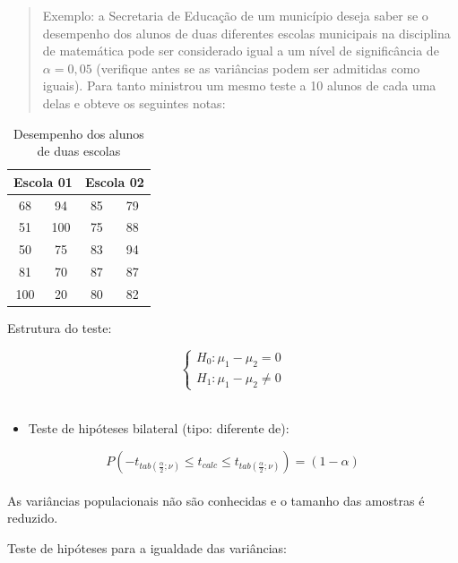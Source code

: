 \documentclass[
]{book}
\providecommand{\tightlist}{%
  \setlength{\itemsep}{0pt}\setlength{\parskip}{0pt}}
\begin{document}
\hfill\break

\begin{quote}
Exemplo: a Secretaria de Educação de um município deseja saber se o desempenho dos alunos de duas diferentes escolas municipais na disciplina de matemática pode ser considerado igual a um nível de significância de \(\alpha=0,05\) (verifique antes se as variâncias podem ser admitidas como iguais). Para tanto ministrou um mesmo teste a 10 alunos de cada uma delas e obteve os seguintes notas:
\end{quote}

\hfill\break

\begin{table}[h]
\centering
\caption{Desempenho dos alunos de duas escolas}
\begin{tabular}{|c|c|c|c|}
\hline 
\multicolumn{2}{|c|}{Escola 01} & \multicolumn{2}{|c|}{Escola 02}   \\ 
\hline 
68 & 94 & 85 & 79 \\ 
\hline 
51 & 100 & 75 & 88 \\ 
\hline 
50 & 75 & 83 & 94 \\ 
\hline 
81 & 70 & 87 & 87 \\ 
\hline 
100 & 20 & 80 & 82 \\ 
\hline 
\end{tabular} 
\end{table}

\hfill\break

\hfill\break

Estrutura do teste:

\[
\begin{cases}
    H_{0}: \mu_{1} - \mu_{2} = 0 \\
    H_{1}: \mu_{1} - \mu_{2} \ne 0 
\end{cases}
\]\\

\begin{itemize}
\tightlist
\item
  Teste de hipóteses bilateral (tipo: diferente de):
\end{itemize}

\[
P (- {t}_{tab\left(\frac{\alpha }{2};\nu \right)}  \le t_{calc}  \le  {t}_{tab\left(\frac{\alpha }{2};\nu \right)}) = (1-\alpha)
\]\\

As variâncias populacionais não são conhecidas e o tamanho das amostras é reduzido.

\hfill\break

Teste de hipóteses para a igualdade das variâncias:
\end{document}
